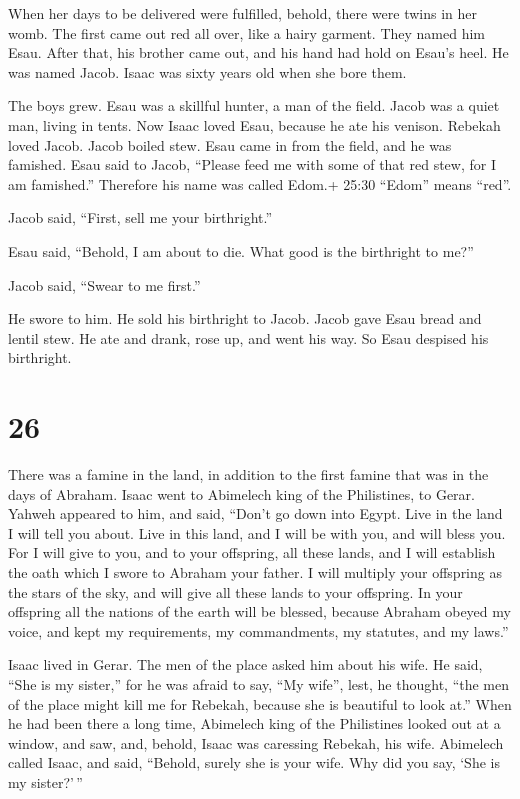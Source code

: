  When her days to be delivered were fulfilled, behold,
there were twins in her womb.  The first came out red all
over, like a hairy garment. They named him Esau.  After
that, his brother came out, and his hand had hold on Esau's heel. He was
named Jacob. Isaac was sixty years old when she bore them.

 The boys grew. Esau was a skillful hunter, a man of the
field. Jacob was a quiet man, living in tents.  Now Isaac
loved Esau, because he ate his venison. Rebekah loved Jacob.
 Jacob boiled stew. Esau came in from the field, and he was
famished.  Esau said to Jacob, ``Please feed me with some
of that red stew, for I am famished.'' Therefore his name was called
Edom.+ 25:30 ``Edom'' means ``red''.

 Jacob said, ``First, sell me your birthright.''

 Esau said, ``Behold, I am about to die. What good is the
birthright to me?''

 Jacob said, ``Swear to me first.''

He swore to him. He sold his birthright to Jacob.  Jacob
gave Esau bread and lentil stew. He ate and drank, rose up, and went his
way. So Esau despised his birthright.

\hypertarget{section-25}{%
\section{26}\label{section-25}}

 There was a famine in the land, in addition to the first
famine that was in the days of Abraham. Isaac went to Abimelech king of
the Philistines, to Gerar.  Yahweh appeared to him, and
said, ``Don't go down into Egypt. Live in the land I will tell you
about.  Live in this land, and I will be with you, and will
bless you. For I will give to you, and to your offspring, all these
lands, and I will establish the oath which I swore to Abraham your
father.  I will multiply your offspring as the stars of the
sky, and will give all these lands to your offspring. In your offspring
all the nations of the earth will be blessed,  because
Abraham obeyed my voice, and kept my requirements, my commandments, my
statutes, and my laws.''

 Isaac lived in Gerar.  The men of the place
asked him about his wife. He said, ``She is my sister,'' for he was
afraid to say, ``My wife'', lest, he thought, ``the men of the place
might kill me for Rebekah, because she is beautiful to look at.''
 When he had been there a long time, Abimelech king of the
Philistines looked out at a window, and saw, and, behold, Isaac was
caressing Rebekah, his wife.  Abimelech called Isaac, and
said, ``Behold, surely she is your wife. Why did you say, `She is my
sister?'\,''

